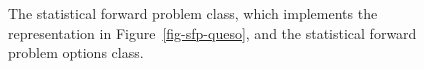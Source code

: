 \begin{figure}[p]
\vspace{-.2cm}
%
\caption{The statistical forward problem class, which implements the representation in Figure~\ref{fig-sfp-queso}, and the statistical forward problem options class.}
\end{figure}




